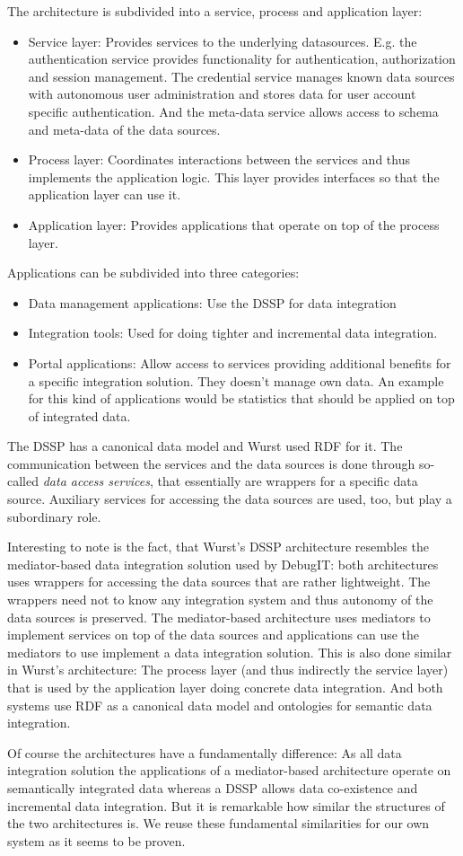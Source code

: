 The architecture is subdivided into a service, process and application layer:
\begin{itemize}
\item Service layer: Provides services to the underlying datasources. E.g. the authentication service provides functionality for authentication, authorization and session management. The credential service manages known data sources with autonomous user administration and stores data for user account specific authentication. And the meta-data service allows access to schema and meta-data of the data sources.
\item Process layer: Coordinates interactions between the services and thus implements the application logic. This layer provides interfaces so that the application layer can use it.
\item Application layer: Provides applications that operate on top of the process layer.
\end{itemize}

Applications can be subdivided into three categories:
\begin{itemize}
\item Data management applications: Use the DSSP for data integration
\item Integration tools: Used for doing tighter and incremental data integration.
\item Portal applications: Allow access to services providing additional benefits for a specific integration solution. They doesn't manage own data.
An example for this kind of applications would be statistics that should be applied on top of integrated data.
\end{itemize}

The DSSP has a canonical data model and Wurst used RDF for it. 
The communication between the services and the data sources is done through so-called \emph{data access services}, that essentially are wrappers for a specific data source. Auxiliary services for accessing the data sources are used, too, but play a subordinary role. 

Interesting to note is the fact, that Wurst's DSSP architecture resembles the mediator-based data integration solution used by DebugIT: both architectures uses wrappers for accessing the data sources that are rather lightweight. The wrappers need not to know any integration system and thus autonomy of the data sources is preserved. The mediator-based architecture uses mediators to implement services on top of the data sources and applications can use the mediators to use implement a data integration solution. This is also done similar in Wurst's architecture: The process layer (and thus indirectly the service layer) that is used by the application layer doing concrete data integration. And both systems use RDF as a canonical data model and ontologies for semantic data integration.

Of course the architectures have a fundamentally difference: As all data integration solution the applications of a mediator-based architecture operate on semantically integrated data whereas a DSSP allows data co-existence and incremental data integration.
But it is remarkable how similar the structures of the two architectures is. We reuse these fundamental similarities for our own system as it seems to be proven.